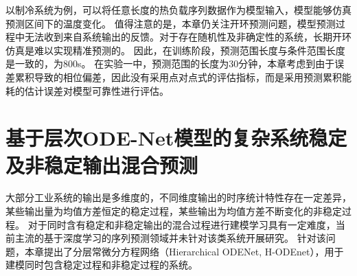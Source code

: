 以制冷系统为例，可以将任意长度的热负载序列数据作为模型输入，模型能够仿真预测区间下的温度变化。
值得注意的是，本章仍关注开环预测问题，模型预测过程中无法收到来自系统输出的反馈。对于存在随机性及非确定性的系统，长期开环仿真是难以实现精准预测的。
因此，在训练阶段，预测范围长度与条件范围长度是一致的，为800s。
在实验一中，预测范围的长度为30分钟，本章考虑到由于误差累积导致的相位偏差，因此没有采用点对点式的评估指标，而是采用预测累积能耗的估计误差对模型可靠性进行评估。



\section{基于层次ODE-Net模型的复杂系统稳定及非稳定输出混合预测}
\label{sec:h-ode}
大部分工业系统的输出是多维度的，不同维度输出的时序统计特性存在一定差异，某些输出量为均值方差恒定的稳定过程，某些输出为均值方差不断变化的非稳定过程。
对于同时含有稳定和非稳定输出的混合过程进行建模学习具有一定难度，当前主流的基于深度学习的序列预测领域并未针对该类系统开展研究。
针对该问题，本章提出了分层常微分方程网络（Hierarchical ODENet, H-ODEnet），用于建模同时包含稳定过程和非稳定过程的系统。

